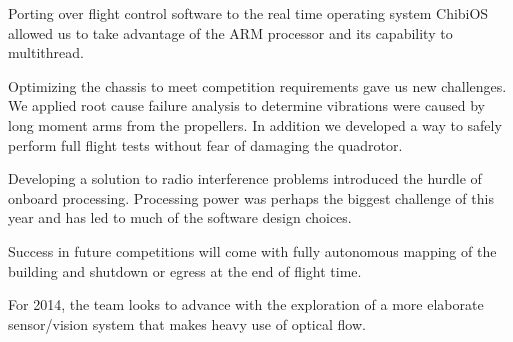 \documentclass[12pt,letterpaper]{article} \usepackage[margin=1in]{geometry}
\begin{document}
Porting over flight control software to the real time operating system ChibiOS
allowed us to take advantage of the ARM processor and its capability to
multithread.

Optimizing the chassis to meet competition requirements gave us new challenges.
We applied root cause failure analysis to determine vibrations were caused by
long moment arms from the propellers. In addition we developed a way to safely
perform full flight tests without fear of damaging the quadrotor.

Developing a solution to radio interference problems introduced the hurdle of
onboard processing. Processing power was perhaps the biggest challenge of this
year and has led to much of the software design choices.

Success in future competitions will come with fully autonomous mapping of the
building and shutdown or egress at the end of flight time.

For 2014, the team looks to advance with the exploration of a more elaborate
sensor/vision system that makes heavy use of optical flow.
\end{document}
